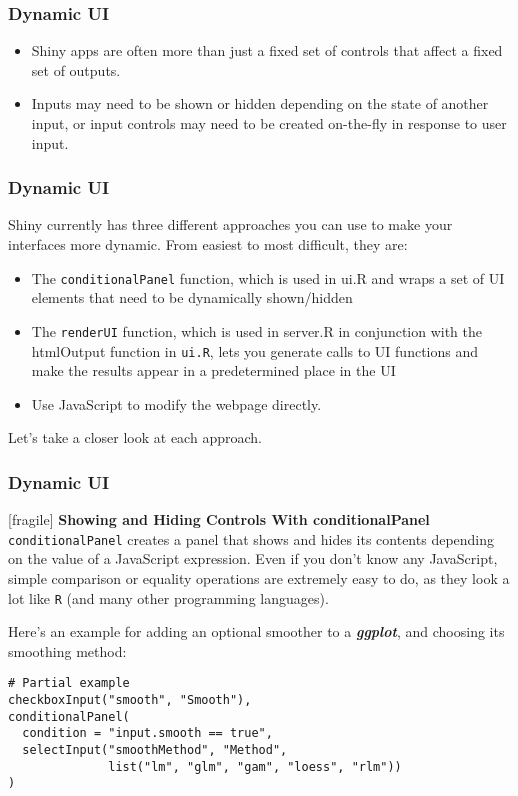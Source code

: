 \documentclass{beamer}
\begin{document}
\begin{frame}
\frametitle{Dynamic UI}
\begin{itemize}
\item Shiny apps are often more than just a fixed set of controls that affect a fixed set of outputs. \item Inputs may need to be shown or hidden depending on the state of another input, or input controls may need to be created on-the-fly in response to user input.
\end{itemize}
\end{frame}
\begin{frame}
\frametitle{Dynamic UI}
Shiny currently has three different approaches you can use to make your interfaces more dynamic. From easiest to most difficult, they are:

\begin{itemize}
\item The \texttt{conditionalPanel} function, which is used in ui.R and wraps a set of UI elements that need to be dynamically shown/hidden
\item The \texttt{renderUI} function, which is used in server.R in conjunction with the htmlOutput function in \texttt{ui.R}, lets you generate calls to UI functions and make the results appear in a predetermined place in the UI

\item Use JavaScript to modify the webpage directly.
\end{itemize}
Let’s take a closer look at each approach.
\end{frame}

\begin{frame}
\frametitle{Dynamic UI}[fragile]
\textbf{Showing and Hiding Controls With conditionalPanel}\\
\texttt{conditionalPanel} creates a panel that shows and hides its contents depending on the value of a JavaScript expression. Even if you don’t know any JavaScript, simple comparison or equality operations are extremely easy to do, as they look a lot like \texttt{R} (and many other programming languages).

Here’s an example for adding an optional smoother to a \textit{\textbf{ggplot}}, and choosing its smoothing method:

\begin{verbatim}
# Partial example
checkboxInput("smooth", "Smooth"),
conditionalPanel(
  condition = "input.smooth == true",
  selectInput("smoothMethod", "Method",
              list("lm", "glm", "gam", "loess", "rlm"))
)
\end{verbatim}
\end{frame}
\end{document}
